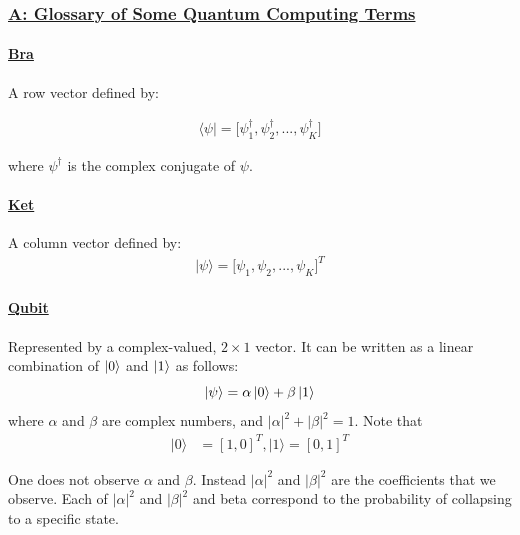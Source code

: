 \documentclass[
]{article}
\begin{document}
\subsubsection*{\texorpdfstring{\underline{A: Glossary of Some Quantum Computing Terms}}{}}\label{section-9}

\paragraph*{\texorpdfstring{\underline{Bra}}{}}\label{section-10}

A row vector defined by:

\begin{align}
   \langle  \psi \vert = \big [ \psi^\dagger_{1}, \psi^\dagger_{2}, ... , \psi^\dagger_{K} \big]
\end{align}

where \(\psi^\dagger\) is the complex conjugate of \(\psi\).

\paragraph*{\texorpdfstring{\underline{Ket}}{}}\label{section-11}

A column vector defined by: \begin{align*}
    \vert \psi \rangle  = \big [ \psi_{1}, \psi_{2}, ... , \psi_K \big]^T
\end{align*}

\paragraph*{\texorpdfstring{\underline{Qubit}}{}}\label{section-12}

Represented by a complex-valued, \(2 \times 1\) vector. It can be
written as a linear combination of \(\ket{0}\) and \(\ket{1}\) as
follows: \[
\ket{\psi} = \alpha\ket{0} + \beta\ket{1}
\] where \(\alpha\) and \(\beta\) are complex numbers, and
\(|\alpha|^2 + |\beta|^2 = 1\). Note that \begin{align}
    \vert 0 \rangle  &=  [1 , 0]^T ,  \vert 1 \rangle = [0, 1]^T 
\end{align}

One does not observe \(\alpha\) and \(\beta\). Instead \(|\alpha|^2\)
and \(|\beta|^2\) are the coefficients that we observe. Each of
\(|\alpha|^2\) and \(|\beta|^2\) and beta correspond to the probability
of collapsing to a specific state.
\end{document}
